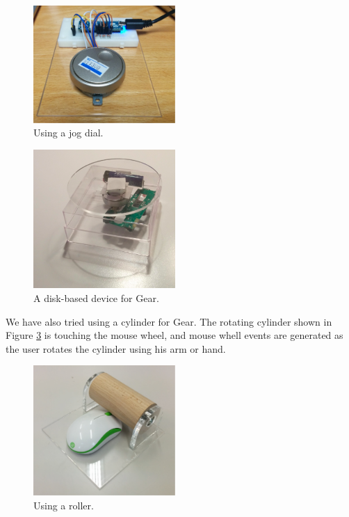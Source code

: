 \documentclass[conference]{IEEEtran}
\begin{document}
\begin{figure}[H]
\centerline{\includegraphics[width=54mm,bb=0 0 1324 1095]{figures/7a2c685b930cd30a267f4d564a8079be.png}}
\caption{Using a jog dial.}
\label{jog}
\end{figure}

\begin{figure}[H]
\centerline{\includegraphics[width=54mm,bb=0 0 362 354]{figures/ff2d18e66f9a4655dbb5e22e0bb9a0ae.png}}
\caption{A disk-based device for Gear.}
\label{disk}
\end{figure}

We have also tried using a cylinder for Gear.
The rotating cylinder shown in Figure \ref{roller} is touching the mouse wheel, and
mouse whell events are generated as the user rotates the cylinder using his arm or hand.

\begin{figure}[H]
\centerline{\includegraphics[width=54mm,bb=0 0 1132 1039]{figures/6ff91502ea4f3f3c47840c887148ada9.png}}
\caption{Using a roller.}
\label{roller}
\end{figure}
\end{document}
